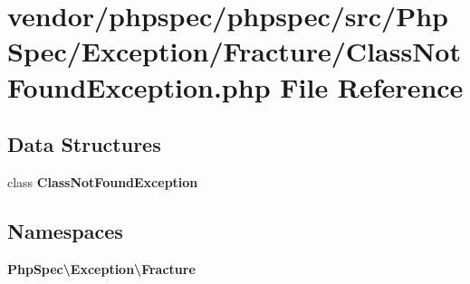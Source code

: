 \section{vendor/phpspec/phpspec/src/\+Php\+Spec/\+Exception/\+Fracture/\+Class\+Not\+Found\+Exception.php File Reference}
\label{phpspec_2phpspec_2src_2_php_spec_2_exception_2_fracture_2_class_not_found_exception_8php}
\subsection*{Data Structures}
\begin{DoxyCompactItemize}
\item 
class {\bf Class\+Not\+Found\+Exception}
\end{DoxyCompactItemize}
\subsection*{Namespaces}
\begin{DoxyCompactItemize}
\item 
 {\bf Php\+Spec\textbackslash{}\+Exception\textbackslash{}\+Fracture}
\end{DoxyCompactItemize}
